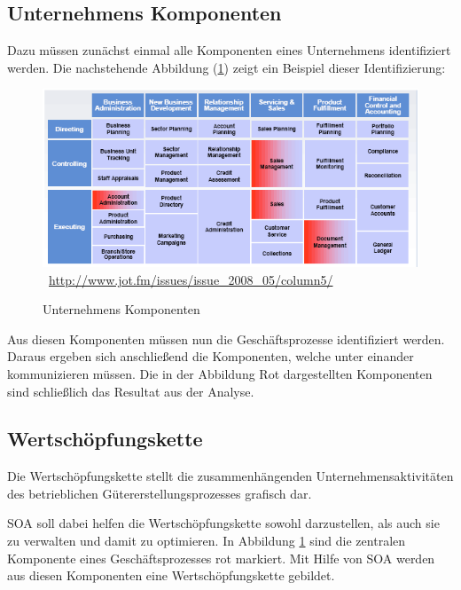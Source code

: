 \subsection{Unternehmens Komponenten}
\label{subsec:UnternehmensKomponenten}
Dazu müssen zunächst einmal alle Komponenten eines Unternehmens identifiziert werden. Die nachstehende Abbildung (\ref{fig:UnternehmensKomponenten}) zeigt ein Beispiel dieser Identifizierung:

\begin{figure}[htb]
    \centering 
    \includegraphics[width=\linewidth]{content/images/UnternehmensKomponenten}\
    \quelle\url{http://www.jot.fm/issues/issue_2008_05/column5/}
    \caption[Unternehmens Komponenten]{Unternehmens Komponenten\\}
    \label{fig:UnternehmensKomponenten}  
\end{figure} 
\newpage
Aus diesen Komponenten müssen nun die Geschäftsprozesse identifiziert werden. Daraus ergeben sich anschließend die Komponenten, welche unter einander kommunizieren müssen. Die in der Abbildung Rot dargestellten Komponenten sind schließlich das Resultat aus der Analyse.

\subsection{Wertschöpfungskette}
\label{subsec:Wertschoepfungskette}
\frqq Die Wertschöpfungskette stellt die zusammenhängenden Unternehmensaktivitäten des betrieblichen Gütererstellungsprozesses grafisch dar.\flqq \cite{gabler}

SOA soll dabei helfen die Wertschöpfungskette sowohl darzustellen, als auch sie zu verwalten und damit zu optimieren. In Abbildung \ref{fig:UnternehmensKomponenten} sind die zentralen Komponente eines Geschäftsprozesses rot markiert. Mit Hilfe von SOA werden aus diesen Komponenten eine Wertschöpfungskette gebildet.

